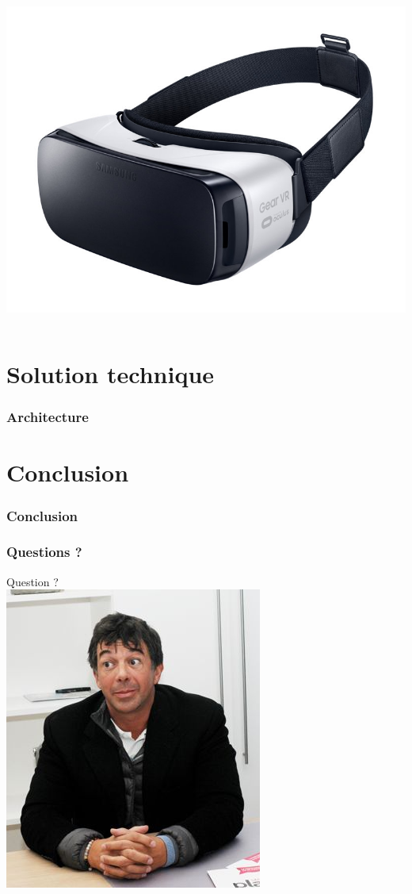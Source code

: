 \documentclass{beamer}
\begin{document}
\begin{frame}
\begin{columns}
    \includegraphics[scale=0.2]{../images/VR.jpeg}
  \end{columns}
\end{frame}

\section{Solution technique}
\begin{frame}
  \frametitle{Architecture}
\end{frame}

\section{Conclusion}
\begin{frame}
  \frametitle{Conclusion}
\end{frame}

\begin{frame}
  \frametitle{Questions ?}
  \begin{center}
    Question ? \\
    \includegraphics[scale=1.2]{../images/agent_immobilier.png}
  \end{center}
\end{frame}
\end{document}
